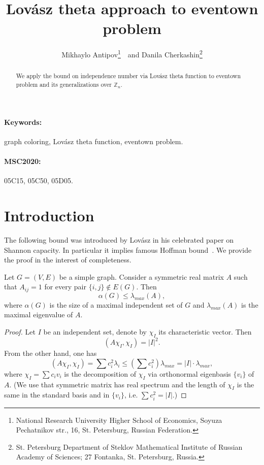 \documentclass[8pt]{article}
\begin{document}
\title{Lov{\'a}sz theta approach to eventown problem}

\author{Mikhaylo Antipov\footnote{National Research University Higher School of Economics, Soyuza Pechatnikov str., 16, St. Petersburg, Russian Federation.}~~and Danila Cherkashin\footnote{St. Petersburg Department
of Steklov Mathematical Institute
of Russian Academy of Sciences;
27 Fontanka, St. Petersburg, Russia.}}




\maketitle

\begin{abstract}
We apply the bound on independence number via Lov{\'a}sz theta function to eventown problem and its generalizations over $\mathbb{Z}_n$.    
\end{abstract}

\paragraph{Keywords:} graph coloring, Lov{\'a}sz theta function, eventown problem.

\paragraph{MSC2020:} 05C15, 05C50, 05D05.




\section{Introduction}

The following bound was introduced by Lov{\'a}sz in his celebrated paper on Shannon capacity. In particular it implies famous Hoffman bound~\cite{haemers2021hoffman}. We provide the proof in the interest of completeness.

\begin{theorem}
Let $G = (V,E)$ be a simple graph. Consider a symmetric real matrix $A$ such that $A_{ij} = 1$ for every pair $\{i,j\} \notin E(G)$.
Then
\[
\alpha(G) \leq \lambda_{max}(A),
\]
where $\alpha(G)$ is the size of a maximal independent set of $G$ and $\lambda_{max}(A)$ is the maximal eigenvalue of $A$.
\label{lovasz}
\end{theorem}

\begin{proof} Let $I$ be an independent set, denote by $\chi_I$ its characteristic vector. Then
\[
(A\chi_I, \chi_I) = |I|^2.
\]
From the other hand, one has
\[
(A\chi_I, \chi_I) = \sum c_i^2\lambda_i \leq \left(\sum c_i^2 \right) \lambda_{max} = |I| \cdot \lambda_{max},
\]
where $\chi_I = \sum c_i v_i$ is the decomposition of $\chi_I$ via orthonormal eigenbasis $\{v_i\}$ of $A$. 
(We use that symmetric matrix has real spectrum and the length of $\chi_I$ is the same in the standard basis and in $\{v_i\}$, i.e. $\sum c_i^2 = |I|$.)
\end{proof}
\end{document}
